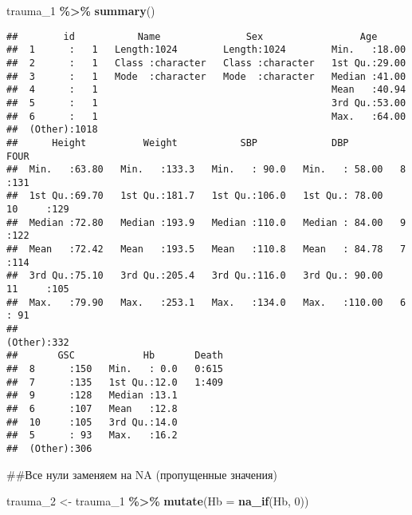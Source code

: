 \documentclass[
]{article}
\newenvironment{Shaded}{\begin{snugshade}}{\end{snugshade}}
\newcommand{\AttributeTok}[1]{\textcolor[rgb]{0.13,0.29,0.53}{#1}}
\newcommand{\DecValTok}[1]{\textcolor[rgb]{0.00,0.00,0.81}{#1}}
\newcommand{\FunctionTok}[1]{\textcolor[rgb]{0.13,0.29,0.53}{\textbf{#1}}}
\newcommand{\NormalTok}[1]{#1}
\newcommand{\OtherTok}[1]{\textcolor[rgb]{0.56,0.35,0.01}{#1}}
\newcommand{\SpecialCharTok}[1]{\textcolor[rgb]{0.81,0.36,0.00}{\textbf{#1}}}
\begin{document}
\begin{Shaded}
\begin{Highlighting}[]
\NormalTok{trauma\_1 }\SpecialCharTok{\%\textgreater{}\%}
  \FunctionTok{summary}\NormalTok{()}
\end{Highlighting}
\end{Shaded}

\begin{verbatim}
##        id           Name               Sex                 Age       
##  1      :   1   Length:1024        Length:1024        Min.   :18.00  
##  2      :   1   Class :character   Class :character   1st Qu.:29.00  
##  3      :   1   Mode  :character   Mode  :character   Median :41.00  
##  4      :   1                                         Mean   :40.94  
##  5      :   1                                         3rd Qu.:53.00  
##  6      :   1                                         Max.   :64.00  
##  (Other):1018                                                        
##      Height          Weight           SBP             DBP              FOUR    
##  Min.   :63.80   Min.   :133.3   Min.   : 90.0   Min.   : 58.00   8      :131  
##  1st Qu.:69.70   1st Qu.:181.7   1st Qu.:106.0   1st Qu.: 78.00   10     :129  
##  Median :72.80   Median :193.9   Median :110.0   Median : 84.00   9      :122  
##  Mean   :72.42   Mean   :193.5   Mean   :110.8   Mean   : 84.78   7      :114  
##  3rd Qu.:75.10   3rd Qu.:205.4   3rd Qu.:116.0   3rd Qu.: 90.00   11     :105  
##  Max.   :79.90   Max.   :253.1   Max.   :134.0   Max.   :110.00   6      : 91  
##                                                                   (Other):332  
##       GSC            Hb       Death  
##  8      :150   Min.   : 0.0   0:615  
##  7      :135   1st Qu.:12.0   1:409  
##  9      :128   Median :13.1          
##  6      :107   Mean   :12.8          
##  10     :105   3rd Qu.:14.0          
##  5      : 93   Max.   :16.2          
##  (Other):306
\end{verbatim}

\#\#Все нули заменяем на NA (пропущенные значения)

\begin{Shaded}
\begin{Highlighting}[]
\NormalTok{trauma\_2 }\OtherTok{\textless{}{-}}\NormalTok{ trauma\_1 }\SpecialCharTok{\%\textgreater{}\%}
  \FunctionTok{mutate}\NormalTok{(}\AttributeTok{Hb =} \FunctionTok{na\_if}\NormalTok{(Hb, }\DecValTok{0}\NormalTok{))}
\end{Highlighting}
\end{Shaded}
\end{document}
